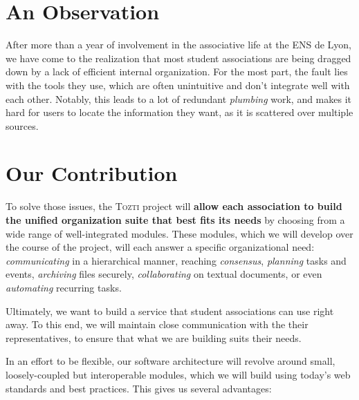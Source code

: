 \documentclass[a4paper, 12pt]{article}
\newcommand{\TOZTI}{\textsc{Tozti}\xspace}
\begin{document}
\newpage

\section{An Observation}
After more than a year of involvement in the associative life at the ENS de Lyon, we have come to the realization that most student associations are being dragged down by a lack of efficient internal organization. For the most part, the fault lies with the tools they use, which are often unintuitive and don't integrate well with each other. Notably, this leads to a lot of redundant \textit{plumbing} work, and makes it hard for users to locate the information they want, as it is scattered over multiple sources.

\section{Our Contribution} %

To solve those issues, the \TOZTI project will \textbf{allow each association to build the unified organization suite that best fits its needs} by choosing from a wide range of well-integrated modules. These modules, which we will develop over the course of the project, will each answer a specific organizational need: \textit{communicating} in a hierarchical manner, reaching \textit{consensus}, \textit{planning} tasks and events, \textit{archiving} files securely, \textit{collaborating} on textual documents, or even \textit{automating} recurring tasks.

Ultimately, we want to build a service that student associations can use right away. To this end, we will maintain close communication with the their representatives, to ensure that what we are building suits their needs.

In an effort to be flexible, our software architecture will revolve around small, loosely-coupled but interoperable modules, which we will build using today's web standards and best practices. This gives us several advantages:
\end{document}
